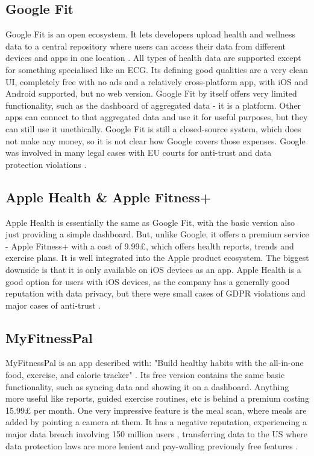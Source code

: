 \subsection{Google Fit}
Google Fit is an open ecosystem. It lets developers upload health and wellness data to a central repository where users can access their data from different devices and apps in one location \cite{googleFit}. All types of health data are supported except for something specialised like an ECG. Its defining good qualities are a very clean UI, completely free with no ads and a relatively cross-platform app, with iOS and Android supported, but no web version.  Google Fit by itself offers very limited functionality, such as the dashboard of aggregated data - it is a platform. Other apps can connect to that aggregated data and use it for useful purposes, but they can still use it unethically. Google Fit is still a closed-source system, which does not make any money, so it is not clear how Google covers those expenses. Google was involved in many legal cases with EU courts for anti-trust \cite{googleAntiTrust} and data protection violations \cite{googleDataProtect, googleDataProtect2}.
\subsection{Apple Health \& Apple Fitness+}
Apple Health is essentially the same as Google Fit, with the basic version also just providing a simple dashboard. But, unlike Google, it offers a premium service - Apple Fitness+ with a cost of 9.99£, which offers health reports, trends and exercise plans. It is well integrated into the Apple product ecosystem. The biggest downside is that it is only available on iOS devices as an app. Apple Health is a good option for users with iOS devices, as the company has a generally good reputation with data privacy, but there were small cases of GDPR violations \cite{CNILApple} and major cases of anti-trust \cite{appleAntiTrust}.
\subsection{MyFitnessPal}
MyFitnessPal is an app described with: "Build healthy habits with the all-in-one food, exercise, and calorie tracker" \cite{fitnesspal}. Its free version contains the same basic functionality, such as syncing data and showing it on a dashboard. Anything more useful like reports, guided exercise routines, etc is behind a premium costing 15.99£ per month. One very impressive feature is the meal scan, where meals are added by pointing a camera at them. It has a negative reputation, experiencing a major data breach involving 150 million users \cite{masuch2021fitness, myFitnessPalDataBreach}, transferring data to the US \cite{myfitnesspalTransferring} where data protection laws are more lenient and pay-walling previously free features \cite{myfitnesspalPaywall}.

